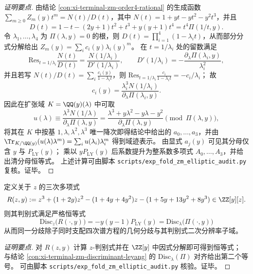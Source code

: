 \begin{proof}[证明要点]
由结论 \ref{con:xi-terminal-zm-order4-rational} 的生成函数
\(
\sum_{m\ge 0}Z_m(y)t^m=N(t)/D(t)
\)，其中
\(
N(t)=1+yt-yt^{2}-y^{2}t^{3}
\)，并且
\[
D(t)=1-t-(2y+1)t^{2}+t^{3}+y(y+1)t^{4}=t^{4}\Pi(1/t,y).
\]
令 \(\lambda_1,\dots,\lambda_4\) 为 \(\Pi(\lambda,y)=0\) 的根，则
\(
D(t)=\prod_{i=1}^{4}(1-\lambda_i t)
\)，从而部分分式分解给出 \(Z_m(y)=\sum_i c_i(y)\lambda_i(y)^m\)。
在 \(t=1/\lambda_i\) 处的留数满足
\[
\mathrm{Res}_{t=1/\lambda_i}\frac{N(t)}{D(t)}=\frac{N(1/\lambda_i)}{D'(1/\lambda_i)},
\qquad
D'(1/\lambda_i)=-\frac{\partial_\lambda\Pi(\lambda_i,y)}{\lambda_i^{2}},
\]
并且若写 \(N(t)/D(t)=\sum_i \frac{c_i(y)}{1-\lambda_i t}\)，则
\(
\mathrm{Res}_{t=1/\lambda_i}\frac{c_i}{1-\lambda_i t}=-c_i/\lambda_i
\)；
故
\[
c_i(y)=\frac{\lambda_i^{3}N(1/\lambda_i)}{\partial_\lambda\Pi(\lambda_i,y)}.
\]
因此在扩张域 \(K=\QQ(y)(\lambda)\) 中可取
\[
u(\lambda)\equiv \frac{\lambda^{3}N(1/\lambda)}{\partial_\lambda\Pi(\lambda,y)}
=\frac{\lambda^{3}+y\lambda^{2}-y\lambda-y^{2}}{\partial_\lambda\Pi(\lambda,y)}
\pmod{\Pi(\lambda,y)},
\]
将其在 \(K\) 中按基 \(1,\lambda,\lambda^{2},\lambda^{3}\) 唯一降次即得结论中给出的 \(a_0,\dots,a_3\)，并由
\(
\Tr_{K/\QQ(y)}(u(\lambda)\lambda^{m})=\sum_i u(\lambda_i)\lambda_i^{m}
\)
得到域迹表示。
由显式 \(a_j(y)\) 可见其分母仅含 \(y\) 与 \(P_{\mathrm{LY}}(y)\)；
乘以 \(yP_{\mathrm{LY}}(y)\) 后系数提升为整系数多项式 \(A_0,\dots,A_3\)，并给出清分母恒等式。
上述计算可由脚本 \texttt{scripts/exp\_fold\_zm\_elliptic\_audit.py} 复核。证毕。
\end{proof}

\begin{conclusion}\label{con:xi-terminal-zm-resolvent-cubic-discriminant-identity}
定义关于 \(z\) 的三次多项式
\[
R(z,y):=z^{3}+(1+2y)z^{2}-(1+4y+4y^{2})z-(1+5y+13y^{2}+8y^{3})\in\ZZ[y][z].
\]
则其判别式满足严格恒等式
\[
\boxed{\;
\mathrm{Disc}_{z}\bigl(R(\cdot,y)\bigr)
=-y(y-1)P_{\mathrm{LY}}(y)
=\mathrm{Disc}_{\lambda}\bigl(\Pi(\cdot,y)\bigr)\;}
\]
从而同一分歧除子同时支配四次谱方程的几何分歧与其判别式二次分辨率子域。
\end{conclusion}
\begin{proof}[证明要点]
对 \(R(z,y)\) 计算 \(z\)-判别式并在 \(\ZZ[y]\) 中因式分解即可得到恒等式；
与结论 \ref{con:xi-terminal-zm-discriminant-leyang} 的 \(\mathrm{Disc}_{\lambda}(\Pi)\) 对齐给出第二个等号。
可由脚本 \texttt{scripts/exp\_fold\_zm\_elliptic\_audit.py} 核验。证毕。
\end{proof}

